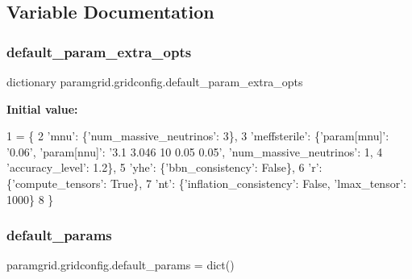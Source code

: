 \subsection{Variable Documentation}
\mbox{\label{namespaceparamgrid_1_1gridconfig_ad4156cd03619ab6116f9d6a24a33bb18}} 
\subsubsection{\texorpdfstring{default\+\_\+param\+\_\+extra\+\_\+opts}{default\_param\_extra\_opts}}
{\footnotesize\ttfamily dictionary paramgrid.\+gridconfig.\+default\+\_\+param\+\_\+extra\+\_\+opts}

{\bfseries Initial value\+:}
\begin{DoxyCode}
1 =  \{
2     \textcolor{stringliteral}{'mnu'}: \{\textcolor{stringliteral}{'num\_massive\_neutrinos'}: 3\},
3     \textcolor{stringliteral}{'meffsterile'}: \{\textcolor{stringliteral}{'param[mnu]'}: \textcolor{stringliteral}{'0.06'}, \textcolor{stringliteral}{'param[nnu]'}: \textcolor{stringliteral}{'3.1 3.046 10 0.05 0.05'}, \textcolor{stringliteral}{'num\_massive\_neutrinos'}: 
      1,
4                     \textcolor{stringliteral}{'accuracy\_level'}: 1.2\},
5     \textcolor{stringliteral}{'yhe'}: \{\textcolor{stringliteral}{'bbn\_consistency'}: \textcolor{keyword}{False}\},
6     \textcolor{stringliteral}{'r': \{'}compute\_tensors': True\},
7     \textcolor{stringliteral}{'nt'}: \{\textcolor{stringliteral}{'inflation\_consistency'}: \textcolor{keyword}{False}, \textcolor{stringliteral}{'lmax\_tensor'}: 1000\}
8 \}
\end{DoxyCode}
\mbox{\label{namespaceparamgrid_1_1gridconfig_a4e4ed74bbba19e4d56533db835195e8c}} 
\subsubsection{\texorpdfstring{default\+\_\+params}{default\_params}}
{\footnotesize\ttfamily paramgrid.\+gridconfig.\+default\+\_\+params = dict()}

